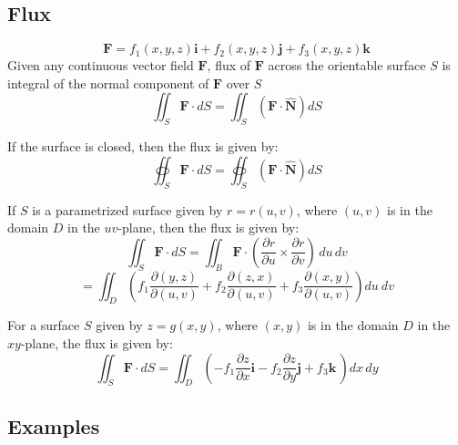 \subsection{Flux}
$$\mathbf{F}=f_1(x,y,z)\mathbf{i}+f_2(x,y,z)\mathbf{j}+f_3(x,y,z)\mathbf{k}$$
Given any continuous vector field $\mathbf{F}$, flux of $\mathbf{F}$ across the orientable surface $S$ is integral of the normal component of $\mathbf{F}$ over $S$
$$\iint_S\mathbf{F}\cdot dS=\iint_{S}(\mathbf{F}\cdot\mathbf{\widehat{N}})dS$$

If the surface is closed, then the flux is given by:
$$\oiint_S\mathbf{F}\cdot dS=\oiint_{S}(\mathbf{F}\cdot\mathbf{\widehat{N}})dS$$

If $S$ is a parametrized surface given by $r=r(u,v)$, where $(u,v)$ is in the domain $D$ in the $uv$-plane, then the flux is given by:
$$\iint_{S}\mathbf{F}\cdot d S=\iint_{B}\mathbf{F}\cdot\left({\frac{\partial r}{\partial u}}\times{\frac{\partial r}{\partial v}}\right)\,d u\,d v$$
$$=\iint_D\left(f_1\frac{\partial (y,z)}{\partial (u,v)}+f_2\frac{\partial (z,x)}{\partial (u,v)}+f_3\frac{\partial (x,y)}{\partial (u,v)}\right)du\ dv$$

For a surface $S$ given by $z=g(x,y)$, where $(x,y)$ is in the domain $D$ in the $xy$-plane, the flux is given by:
$$\iint_{S}\mathbf{F}\cdot d S=\iint_D\left(-f_{1}\frac{\partial z}{\partial x}\mathbf{i}-f_{2}\frac{\partial z}{\partial y}\mathbf{j}+f_{3}\mathbf{k}\,\right)d x\,d y$$
\subsection{Examples}
